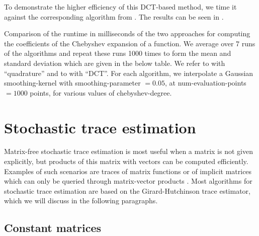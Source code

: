 To demonstrate the higher efficiency of this \gls{DCT}-based method, we time it
against the corresponding algorithm from \cite{lin2017randomized}. The results
can be seen in .

\begin{table}[ht]
    \caption{Comparison of the runtime in milliseconds of the two approaches for computing the coefficients
        of the Chebyshev expansion of a function. We average over 7 runs of the
        algorithms and repeat these runs 1000 times to form the mean and standard
        deviation which are given in the below table. We refer to
        \cite[algorithm~1]{lin2017randomized} with \enquote{quadrature}
        and to  with \enquote{DCT}.
        For each algorithm, we interpolate a Gaussian \gls{smoothing-kernel} with \gls{smoothing-parameter} $=0.05$,
        at \gls{num-evaluation-points} $=1000$ points, for various values of \gls{chebyshev-degree}.}
    \label{tab:2-chebyshev-timing-interpolation}
   
\end{table}


\section{Stochastic trace estimation}
\label{sec:2-chebyshev-stochastic-trace-estimation}

Matrix-free stochastic trace estimation is most useful when a matrix is not given
explicitly, but products of this matrix with vectors can be computed
efficiently. Examples of such scenarios are traces of matrix functions
\cite{ubaru2017lanczos,epperly2023xtrace} or of implicit matrices which can only
be queried through matrix-vector products \cite{ghorbani2019investigation,adepu2021hessian}.
Most algorithms for stochastic trace estimation are based on the Girard-Hutchinson
trace estimator, which we will discuss in the following paragraphs.\\


\subsection{Constant matrices}
\label{subsec:2-chebyshev-trace-constant}

